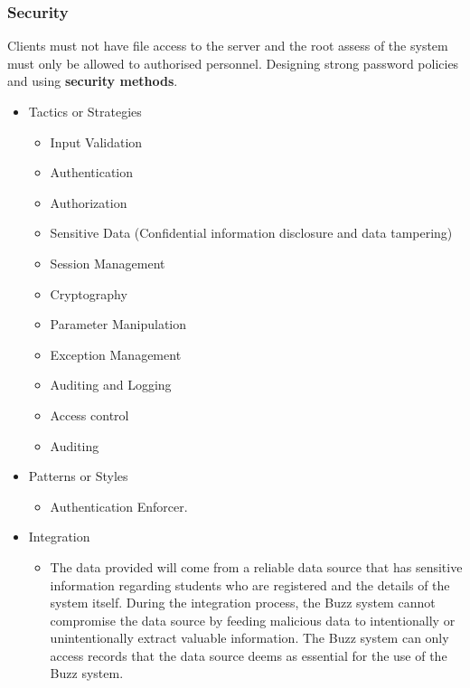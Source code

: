 \subsubsection{Security}
		Clients must not have file access to the server and the root assess of the system must only be allowed to authorised personnel. Designing strong password policies and using \textbf{security methods}.
		\begin{itemize}
	\item{Tactics or Strategies}
		\begin{itemize}
			\item Input Validation
			\item Authentication
			\item Authorization
			\item Sensitive Data (Confidential information disclosure and data tampering)
			\item Session Management
			\item Cryptography
			\item Parameter Manipulation
			\item Exception Management
			\item Auditing and Logging
			\item Access control
			\item Auditing
		\end{itemize}
	\item{Patterns or Styles}
		\begin{itemize}
			\item Authentication Enforcer.
		\end{itemize}
	\item{Integration}
		\begin{itemize}
			\item  The data provided will come from a reliable data source that has sensitive information regarding students who are registered and the details of the system itself. During the integration process, the Buzz system cannot compromise the data source by feeding malicious data to intentionally or unintentionally extract valuable information. The Buzz system can only access records that the data source deems as essential for the use of the Buzz system.
		\end{itemize}
\end{itemize}

